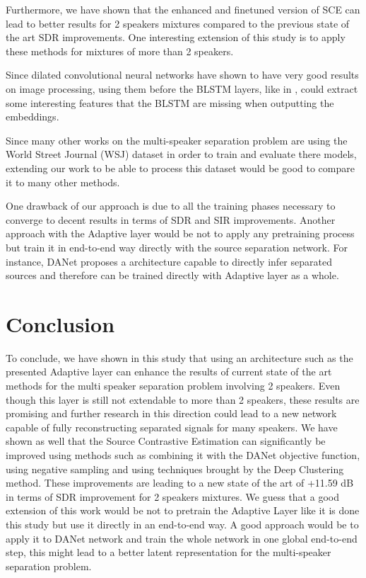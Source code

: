 \documentclass[master, tikz, final,11pt, dvipdfmx]{iscs-thesis}
\begin{document}
Furthermore, we have shown that the enhanced and finetuned version of SCE can lead to better results for 2 speakers mixtures compared to the previous state of the art SDR improvements. One interesting extension of this study is to apply these methods for mixtures of more than 2 speakers.

Since dilated convolutional neural networks have shown to have very good results on image processing, using them before the BLSTM layers, like in \cite{ImageSS}, could extract some interesting features that the BLSTM are missing when outputting the embeddings.

Since many other works on the multi-speaker separation problem are using the World Street Journal (WSJ) dataset in order to train and evaluate there models, extending our work to be able to process this dataset would be good to compare it to many other methods.

One drawback of our approach is due to all the training phases necessary to converge to decent results in terms of SDR and SIR improvements. Another approach with the Adaptive layer would be not to apply any pretraining process but train it in end-to-end way directly with the source separation network. For instance, DANet \cite{DANet} proposes a architecture capable to directly infer separated sources and therefore can be trained directly with Adaptive layer as a whole.

\chapter{Conclusion}

To conclude, we have shown in this study that using an architecture such as the presented Adaptive layer can enhance the results of current state of the art methods for the multi speaker separation problem involving 2 speakers. Even though this layer is still not extendable to more than 2 speakers, these results are promising and further research in this direction could lead to a new network capable of fully reconstructing separated signals for many speakers.
We have shown as well that the Source Contrastive Estimation can significantly be improved using methods such as combining it with the DANet objective function, using negative sampling and using techniques brought by the Deep Clustering method. These improvements are leading to a new state of the art of +11.59 dB in terms of SDR improvement for 2 speakers mixtures.
We guess that a good extension of this work would be not to pretrain the Adaptive Layer like it is done this study but use it directly in an end-to-end way. A good approach would be to apply it to DANet \cite{DANet} network and train the whole network in one global end-to-end step, this might lead to a better latent representation for the multi-speaker separation problem.





\end{document}
